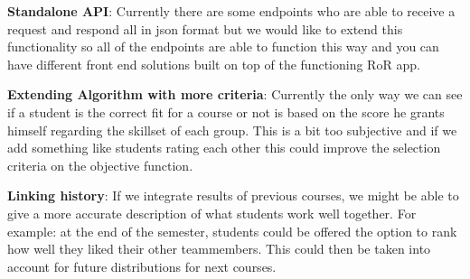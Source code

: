\textbf{Standalone API}: Currently there are some endpoints who are able to receive a request and respond all in json format but we would like to extend this functionality so all of the endpoints are able to function this way and you can have different front end solutions built on top of the functioning RoR app.

\textbf{Extending Algorithm with more criteria}: Currently the only way we can see if a student is the correct fit for a course or not is based on the score he grants himself regarding the skillset of each group. This is a bit too subjective and if we add something like students rating each other this could improve the selection criteria on the objective function.

\textbf{Linking history}: If we integrate results of previous courses, we might be able to give a more accurate description of what students work well together. For example: at the end of the semester, students could be offered the option to rank how well they liked their other teammembers. This could then be taken into account for future distributions for next courses.